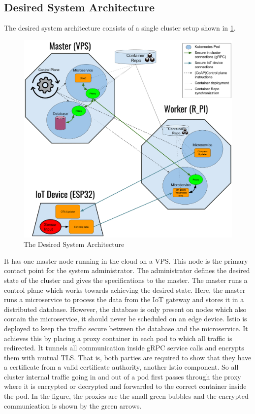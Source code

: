 \subsection{Desired System Architecture} \label{sec:desiredSystem}
The desired system architecture consists of a single cluster setup shown in \cref{fig:implementationSetup}.
\begin{figure}
    \centering
    \includegraphics[scale=0.25]{figures/implementationSetup.png}
    \caption{The Desired System Architecture}
    \label{fig:implementationSetup}
\end{figure}
It has one master node running in the cloud on a VPS. This node is the primary contact point for the system administrator. The administrator defines the desired state of the cluster and gives the specifications to the master. The master runs a control plane which works towards achieving the desired state. Here, the master runs a microservice to process the data from the IoT gateway and stores it in a distributed database. However, the database is only present on nodes which also contain the microservice, it should never be scheduled on an edge device. Istio is deployed to keep the traffic secure between the database and the microservice. It achieves this by placing a proxy container in each pod to which all traffic is redirected. It tunnels all communication inside gRPC service calls and encrypts them with mutual TLS. That is, both parties are required to show that they have a certificate from a valid certificate authority, another Istio component. So all cluster internal traffic going in and out of a pod first passes through the proxy where it is encrypted or decrypted and forwarded to the correct container inside the pod. In the figure, the proxies are the small green bubbles and the encrypted communication is shown by the green arrows.

